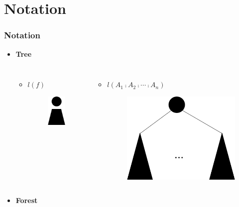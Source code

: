 \documentclass{beamer}
\begin{document}
\section{Notation}
\begin{frame}
\frametitle{Notation}
\begin{itemize}
\item \textbf{Tree} 
\begin{columns}[c] %
\begin{itemize}
\item $l(f)$
\begin{figure}
	\includegraphics[width=0.2\linewidth]{Tree}
	\label{Tree} 
	\centering
\end{figure}
\end{itemize}
\begin{itemize}
\item $l(A_1 \comp A_2 \comp \cdots \comp A_n)$
\begin{figure}
	\includegraphics[width=0.5\linewidth]{Tree2}
	\label{Another Tree Representation} 
	\centering
\end{figure}
\end{itemize}
\end{columns}
\item \textbf{Forest} 
\begin{columns}[c] %

\end{columns}
\end{itemize}
\end{frame}
\end{document}
